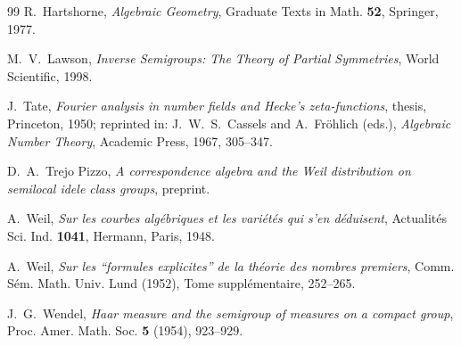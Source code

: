 \documentclass[11pt]{amsart}
\theoremstyle{definition}
\begin{document}
\begin{thebibliography}{99}
R.~Hartshorne, \emph{Algebraic Geometry}, Graduate Texts in Math.
\textbf{52}, Springer, 1977.

M.~V.~Lawson, \emph{Inverse Semigroups: The Theory of Partial Symmetries},
World Scientific, 1998.

J.~Tate, \emph{Fourier analysis in number fields and Hecke's
zeta-functions}, thesis, Princeton, 1950; reprinted in: J.~W.~S.~Cassels and
A.~Fr\"ohlich (eds.), \emph{Algebraic Number Theory}, Academic Press, 1967,
305--347.

D.~A.~Trejo Pizzo, \emph{A correspondence algebra and the Weil distribution
on semilocal idele class groups}, preprint.

A.~Weil, \emph{Sur les courbes alg\'ebriques et les vari\'et\'es qui s'en
d\'eduisent}, Actualit\'es Sci. Ind. \textbf{1041}, Hermann, Paris, 1948.

A.~Weil, \emph{Sur les ``formules explicites'' de la th\'eorie des nombres
premiers}, Comm. S\'em. Math. Univ. Lund (1952), Tome suppl\'ementaire,
252--265.

J.~G.~Wendel, \emph{Haar measure and the semigroup of measures on a compact
group}, Proc. Amer. Math. Soc. \textbf{5} (1954), 923--929.

\end{thebibliography}
\end{document}
